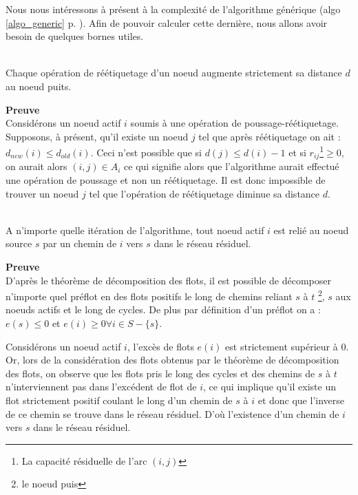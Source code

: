 Nous nous intéressons à présent à la complexité de l'algorithme générique (algo
\ref{algo_generic} p. \pageref{algo_generic}). Afin de pouvoir calculer cette dernière, nous allons
avoir besoin de quelques bornes utiles.

\begin{lemma} ~\\
	\label{increase_distance}
	Chaque opération de réétiquetage d'un noeud augmente strictement sa distance $d$ au noeud puits.
\end{lemma}

\textbf{Preuve} \\
Considérons un noeud actif $i$ soumis à une opération de poussage-réétiquetage. Supposons, à présent,
qu'il existe un noeud $j$ tel que après réétiquetage on ait : $d_{new}(i) \leq d_{old}(i)$. Ceci
n'est possible que si $d(j) \leq d(i) - 1$ et si $r_{ij}$\footnote{La capacité résiduelle de l'arc
$(i,j)$}$\geq 0$, on aurait alors $(i,j) \in A_i$ ce qui signifie alors que l'algorithme aurait
effectué une opération de poussage et non un réétiquetage. Il est donc impossible de trouver un
noeud $j$ tel que l'opération de réétiquetage diminue sa distance $d$.

\begin{lemma} ~\\
	\label{residual_path}
	A n'importe quelle itération de l'algorithme, tout noeud actif $i$ est relié au noeud source $s$ par un
	chemin de $i$ vers $s$ dans le réseau résiduel.
\end{lemma}

\textbf{Preuve}\\
D'après le théorème de décomposition des flots, il est possible de décomposer n'importe quel préflot
en des flots positifs le long de chemins reliant $s$ à $t$ \footnote{le noeud puis}, $s$ aux noeuds
actifs et le long de cycles. De plus par définition d'un préflot on a : $e(s) \leq 0$ et $e(i) \geq
0 \forall i \in S - \{s\}$.

Considérons un noeud actif $i$, l'excès de flots $e(i)$ est strictement supérieur à $0$. Or, lors de la
considération des flots obtenus par le théorème de décomposition des flots, on observe que les flots
pris le long des cycles et des chemins de $s$ à $t$ n'interviennent pas dans l'excédent de flot de
$i$, ce qui implique qu'il existe un flot strictement positif coulant le long d'un chemin de $s$ à
$i$ et donc que l'inverse de ce chemin se trouve dans le réseau résiduel. D'où l'existence d'un chemin
de $i$ vers $s$ dans le réseau résiduel.\\

